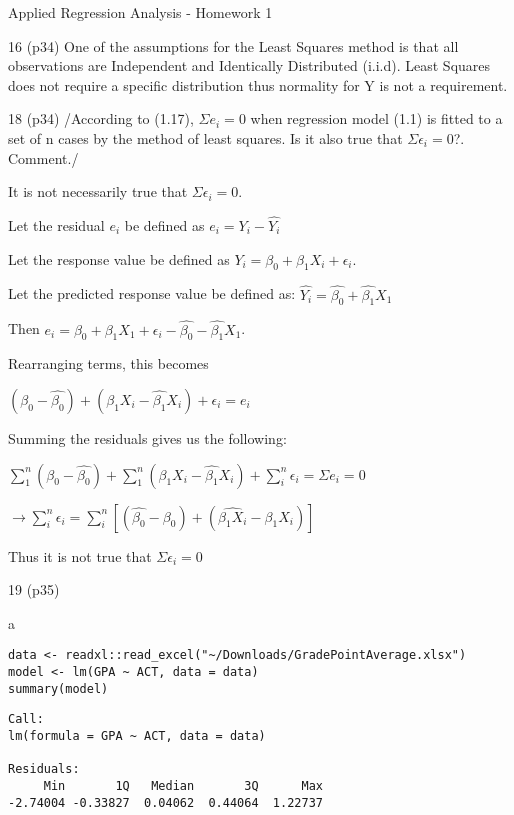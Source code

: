 \documentclass[11pt]{article}
\begin{document}
\begin{frame}[label={sec:orgb1fb7b8},fragile]{Applied Regression Analysis - Homework 1}
\begin{block}{16 (p34)}
One of the assumptions for the Least Squares method is that all observations are
Independent and Identically Distributed (i.i.d). Least Squares does not require a
specific distribution thus normality for Y is not a requirement.
\end{block}

\begin{block}{18 (p34)}
/According to (1.17), \(\Sigma e_i = 0\) when regression model (1.1) is fitted to
a set of n cases by the method of least squares. Is it also true that \(\Sigma
\epsilon_i = 0\)?. Comment./

It is not necessarily true that \(\Sigma \epsilon_i = 0\).

Let the residual \(e_i\) be defined as \(e_i = Y_i - \hat{Y_i}\)

Let the response value be defined as \(Y_i = \beta_0 + \beta_1 X_i + \epsilon_i\).

Let the predicted response value be defined as:
\(\hat{Y_i} = \hat{\beta_0} + \hat{\beta_1} X_1\)

Then \(e_i = \beta_0 + \beta_1 X_1 + \epsilon_i - \hat{\beta_0} - \hat{\beta_1}
X_1\).

Rearranging terms, this becomes

\((\beta_0 - \hat{\beta_0}) + (\beta_1 X_i - \hat{\beta_1} X_i) + \epsilon_i =
e_i\)

Summing the residuals gives us the following:

\(\sum_{1}^{n} (\beta_0 - \hat{\beta_0}) + \sum_{1}^{n} (\beta_1 X_i - \hat{\beta_1} X_i) + \sum_{i}^{n} \epsilon_i = \Sigma e_i = 0\)

\(\to \sum_{i}^{n} \epsilon_i = \sum_{i}^{n} [(\hat{\beta_0} - \beta_0) + (\hat{\beta_1 X_i} - \beta_1 X_i) ]\)

Thus it is not true that \(\Sigma \epsilon_i = 0\)
\end{block}

\begin{block}{19 (p35)}
\begin{block}{a}
\begin{verbatim}
data <- readxl::read_excel("~/Downloads/GradePointAverage.xlsx")
model <- lm(GPA ~ ACT, data = data)
summary(model)
\end{verbatim}

\begin{verbatim}
Call:
lm(formula = GPA ~ ACT, data = data)

Residuals:
     Min       1Q   Median       3Q      Max 
-2.74004 -0.33827  0.04062  0.44064  1.22737 


\end{verbatim}
\end{block}
\end{block}
\end{frame}
\end{document}
